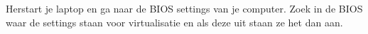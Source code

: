 Herstart je laptop en ga naar de BIOS settings van je computer. Zoek in de BIOS waar de settings staan voor virtualisatie en als deze uit staan ze het dan aan.
